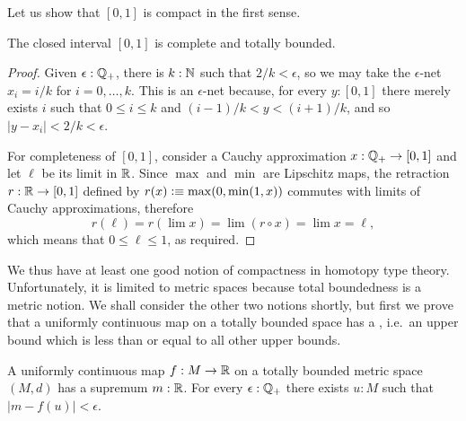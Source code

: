 Let us show that $[0,1]$ is compact in the first sense.

\begin{thm} \label{analysis-interval-ctb}
  The closed interval $[0,1]$ is complete and totally bounded.
\end{thm}

\begin{proof}
  Given $\epsilon : \mathbb{Q}_{+}$, there is $k : \mathbb{N}$ such that $2/k < \epsilon$, so we may take the
  $\epsilon$-net $x_i = i/k$ for $i = 0, \ldots, k$. This is an $\epsilon$-net because,
  for every $y : [0,1]$ there merely exists $i$ such that $0 \leq i \leq k$ and $(i -
  1)/k < y < (i+1)/k$, and so $|y - x_i| < 2/k < \epsilon$.

  For completeness of $[0,1]$, consider a Cauchy approximation $x : \mathbb{Q}_{+} \to
  [0,1]$ and let $\ell$ be its limit in $\mathbb{R}$. Since $\max$ and $\min$ are Lipschitz maps,
  the retraction $r : \mathbb{R} \to [0,1]$ defined by $r(x) \vcentcolon\equiv \max(0, \min(1, x))$ commutes
  with limits of Cauchy approximations, therefore
  \begin{equation*}
    r(\ell) =
    r (\lim x) =
    \lim (r \circ x) =
    \lim x =
    \ell,
  \end{equation*}
  which means that $0 \leq \ell \leq 1$, as required.
\end{proof}

We thus have at least one good notion of compactness in homotopy type theory.
Unfortunately, it is limited to metric spaces because total boundedness is a metric
notion. We shall consider the other two notions shortly, but first we prove that a
uniformly continuous map on a totally bounded space has a ,
%
i.e.\ an upper bound which is less than or equal to all other upper bounds.

\begin{thm} \label{ctb-uniformly-continuous-sup}
  A uniformly continuous map $f : M \to \mathbb{R}$ on a totally bounded metric space
  $(M, d)$ has a supremum $m : \mathbb{R}$. For every $\epsilon : \mathbb{Q}_{+}$ there exists $u : M$ such
  that $|m - f(u)| < \epsilon$.
\end{thm}

